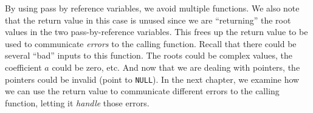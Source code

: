 By using pass by reference variables, we avoid multiple functions.
We also note that the return value in this case is unused since
we are ``returning'' the root values in the two pass-by-reference
variables.  This frees up the return value to be used to communicate
\emph{errors} to the calling function.  Recall that there could
be several ``bad'' inputs to this function.  The roots could be complex
values, the coefficient $a$ could be zero, etc.  And now that we
are dealing with pointers, the pointers could be invalid (point to
\texttt{NULL}).  In the next chapter, we examine how we
can use the return value to communicate different errors to the
calling function, letting it \emph{handle} those errors.







